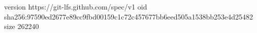 version https://git-lfs.github.com/spec/v1
oid sha256:97590ed2677e89cc9fbd00159c1c72c457677bb6eed505a1538bb253e4d25482
size 262240
